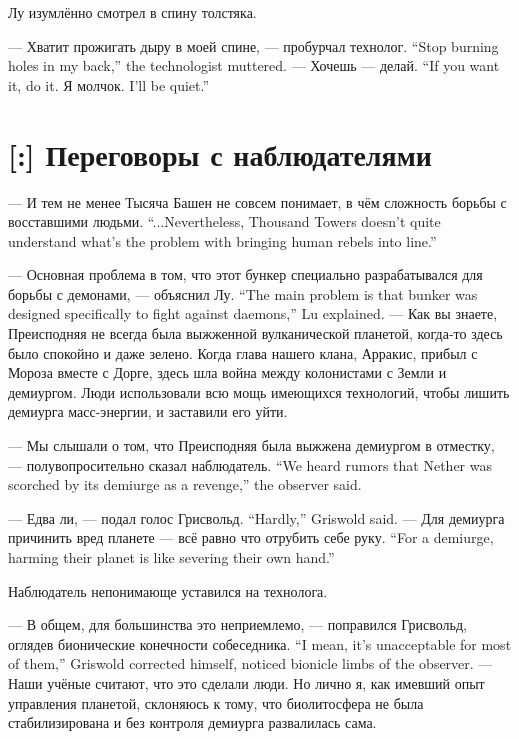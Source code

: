 Лу изумлённо смотрел в спину толстяка.

{--- Хватит прожигать дыру в моей спине, --- пробурчал технолог.}
{``Stop burning holes in my back,'' the technologist muttered.}
{--- Хочешь --- делай.}
{``If you want it, do it.}
{Я молчок.}
{I'll be quiet.''}

\section{[:] Переговоры с наблюдателями}

{--- И тем не менее Тысяча Башен не совсем понимает, в чём сложность борьбы с восставшими людьми.}
{``...Nevertheless, Thousand Towers doesn't quite understand what's the problem with bringing human rebels into line.''}

{--- Основная проблема в том, что этот бункер специально разрабатывался для борьбы с демонами, --- объяснил Лу.}
{``The main problem is that bunker was designed specifically to fight against daemons,'' Lu explained.}
--- Как вы знаете, Преисподняя не всегда была выжженной вулканической планетой, когда-то здесь было спокойно и даже зелено.
Когда глава нашего клана, Арракис, прибыл с Мороза вместе с Дорге, здесь шла война между колонистами с Земли и демиургом.
Люди использовали всю мощь имеющихся технологий, чтобы лишить демиурга масс-энергии, и заставили его уйти.

{--- Мы слышали о том, что Преисподняя была выжжена демиургом в отместку, --- полувопросительно сказал наблюдатель.}
{``We heard rumors that Nether was scorched by its demiurge as a revenge,'' the observer said.}

{--- Едва ли, --- подал голос Грисвольд.}
{``Hardly,'' Griswold said.}
{--- Для демиурга причинить вред планете --- всё равно что отрубить себе руку.}
{``For a demiurge, harming their planet is like severing their own hand.''}

Наблюдатель непонимающе уставился на технолога.

{--- В общем, для большинства это неприемлемо, --- поправился Грисвольд, оглядев бионические конечности собеседника.}
{``I mean, it's unacceptable for most of them,'' Griswold corrected himself, noticed bionicle limbs of the observer.}
--- Наши учёные считают, что это сделали люди.
Но лично я, как имевший опыт управления планетой, склоняюсь к тому, что биолитосфера не была стабилизирована и без контроля демиурга развалилась сама.


